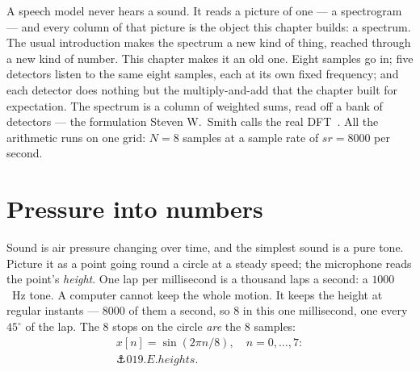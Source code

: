 \begin{narrative}
A speech model never hears a sound. It reads a picture of one — a
spectrogram — and every column of that picture is the object this
chapter builds: a spectrum. The usual introduction makes the spectrum a
new kind of thing, reached through a new kind of number. This chapter
makes it an old one. Eight samples go in; five detectors listen to the
same eight samples, each at its own fixed frequency; and each detector
does nothing but the multiply-and-add that the 
chapter built for expectation. The spectrum is a column of weighted sums, read
off a bank of detectors — the formulation Steven W.~Smith calls the real
DFT~\cite{signal_processing-smith-guide-to-dsp-ch-8-the-dft}. All the
arithmetic runs on one grid: $N = 8$ samples at a sample rate of $sr =
8000$ per second.

\section{Pressure into numbers}

Sound is air pressure changing over time, and the simplest sound is a
pure tone. Picture it as a point going round a circle at a steady
speed; the microphone reads the point's \emph{height}. One lap per
millisecond is a thousand laps a second: a $1000$~Hz tone. A computer
cannot keep the whole motion. It keeps the height at regular instants —
$8000$ of them a second, so $8$ in this one millisecond, one every
$45^\circ$ of the lap. The $8$ stops on the circle \emph{are} the $8$
samples:
\begin{gather*}
  x[n] = \sin(2\pi n/8), \quad n = 0, \ldots, 7: \\
  \anchor{019.E.heights}.
\end{gather*}

\begin{center}
\end{center}


\end{narrative}
